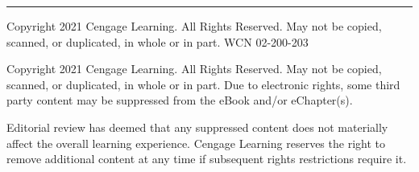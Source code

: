 \vspace*{\fill}

\noindent\rule{\textwidth}{0.4pt}
\vspace{1pt}
\centerline{\fontsize{6}{7.5}\selectfont\color{gray} Copyright 2021 Cengage Learning. All Rights Reserved. May not be copied, scanned, or duplicated, in whole or in part. WCN 02-200-203}
\centerline{\fontsize{5.5}{7}\selectfont\color{gray} Copyright 2021 Cengage Learning. All Rights Reserved. May not be copied, scanned, or duplicated, in whole or in part. Due to electronic rights, some third party content may be suppressed from the eBook and/or eChapter(s).}
\centerline{\fontsize{5.5}{7}\selectfont\color{gray} Editorial review has deemed that any suppressed content does not materially affect the overall learning experience. Cengage Learning reserves the right to remove additional content at any time if subsequent rights restrictions require it.}
